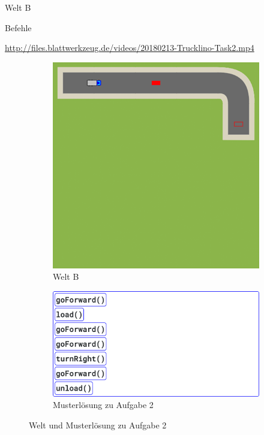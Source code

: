 \begin{description}[noitemsep]
  \item[Welt wählen:] Welt B
  \item[Du brauchst:] Befehle
  \item[Video:] \url{http://files.blattwerkzeug.de/videos/20180213-Trucklino-Task2.mp4}
\end{description}

\begin{figure}[H]
  \begin{subfigure}[b]{0.40\textwidth}
    \includegraphics[width=\textwidth]{gfx/exercises-world-b.png}
    \caption{Welt B}
  \end{subfigure}\hfill
  \begin{subfigure}[b]{0.40\textwidth}
    \includegraphics[width=\textwidth]{gfx/exercises-program-2.png}
    \caption{Musterlösung zu Aufgabe 2}
  \end{subfigure}\hfill
  \caption{Welt und Musterlösung zu Aufgabe 2}
\end{figure}

